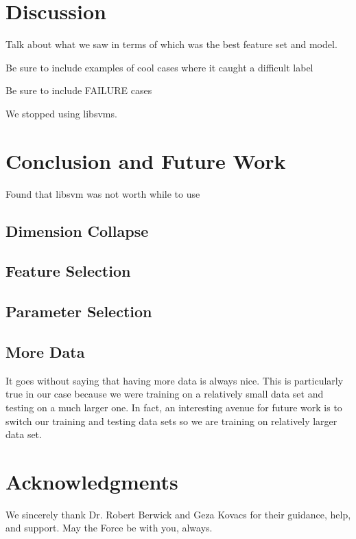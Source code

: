 \documentclass[preprint]{style}
\begin{document}
\section{Discussion}

Talk about what we saw in terms of which was the best feature set and model. 

Be sure to include examples of cool cases where it caught a difficult label

Be sure to include FAILURE cases


We stopped using libsvms.


\section{Conclusion and Future Work}


Found that libsvm was not worth while to use

\subsection{Dimension Collapse}

\subsection{Feature Selection}

\subsection{Parameter Selection}

\subsection{More Data}

It goes without saying that having more data is always nice. This is particularly true in our case because we were training on a relatively small data set and testing on a much larger one. In fact, an interesting avenue for future work is to switch our training and testing data sets so we are training on relatively larger data set.
	
\section{Acknowledgments}

We sincerely thank Dr. Robert Berwick  and Geza Kovacs
for their guidance, help, and support. May the Force be with you,
always.



%


\balancecolumns
\end{document}
